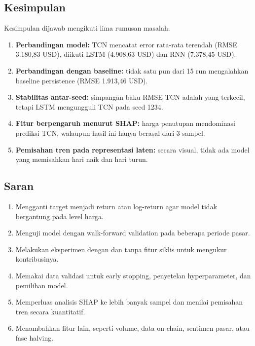 \documentclass[conference,a4paper]{IEEEtran}
\begin{document}
\subsection{Kesimpulan}
Kesimpulan dijawab mengikuti lima rumusan masalah.
\begin{enumerate}
\item \textbf{Perbandingan model:} TCN mencatat error rata-rata terendah (RMSE 3.180,83 USD), diikuti LSTM (4.908,63 USD) dan RNN (7.378,45 USD).
\item \textbf{Perbandingan dengan baseline:} tidak satu pun dari 15 run mengalahkan baseline persistence (RMSE 1.913,46 USD).
\item \textbf{Stabilitas antar-seed:} simpangan baku RMSE TCN adalah yang terkecil, tetapi LSTM mengungguli TCN pada seed 1234.
\item \textbf{Fitur berpengaruh menurut SHAP:} harga penutupan mendominasi prediksi TCN, walaupun hasil ini hanya berasal dari 3 sampel.
\item \textbf{Pemisahan tren pada representasi laten:} secara visual, tidak ada model yang memisahkan hari naik dan hari turun.
\end{enumerate}

\subsection{Saran}
\begin{enumerate}
\item Mengganti target menjadi return atau log-return agar model tidak bergantung pada level harga.
\item Menguji model dengan walk-forward validation pada beberapa periode pasar.
\item Melakukan eksperimen dengan dan tanpa fitur siklis untuk mengukur kontribusinya.
\item Memakai data validasi untuk early stopping, penyetelan hyperparameter, dan pemilihan model.
\item Memperluas analisis SHAP ke lebih banyak sampel dan menilai pemisahan tren secara kuantitatif.
\item Menambahkan fitur lain, seperti volume, data on-chain, sentimen pasar, atau fase halving.
\end{enumerate}
\end{document}
